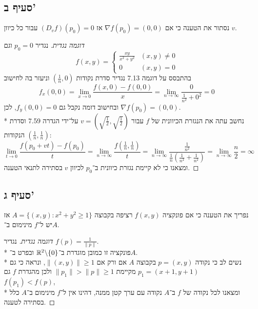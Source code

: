 \subsection{סעיף ב'}
נסתור את הטענה כי אם $\nabla f(p_0) = (0, 0)$ אז $(D_v f)(p_0) = 0$ עבור כל כיוון $v$.
\begin{proof}[דוגמה נגדית]
	נגדיר $p_0 = 0$ וגם 
	\[
		f(x, y) =
		\begin{cases}
			\frac{xy}{x^2 + y^2} & (x, y) \ne 0 \\
			0 & (x, y) = 0
		\end{cases}
	\]
	בהתבסס על דוגמה 7.13 נגדיר סדרת נקודות $(\frac{1}{n}, 0)$ וניעזר בה לחישוב
	\[
		f_x(0, 0)
		= \lim_{x \to 0} \frac{f(x, 0) - f(0, 0)}{x}
		= \lim_{n \to \infty} \frac{0}{\frac{1}{n^2} + 0^2}
		= 0
	\]
	ובחישוב דומה נקבל גם $f_y(0, 0) = 0$, לכן $\nabla f(p_0) = (0, 0)$. \\*
	נחשב עתה את הנגזרת הכיוונית של $f$ עבור $v = (\sqrt{\frac{1}{2}}, \sqrt{\frac{1}{2}})$ על־ידי הגדרה 7.59 וסדרת הנקודות $(\frac{1}{n}, \frac{1}{n})$:
	\[
		\lim_{t \to 0} \frac{f(p_0 + vt) - f(p_0)}{t}
		= \lim_{n \to \infty} \frac{f(\frac{1}{n}, \frac{1}{n})}{t}
		= \lim_{n \to \infty} \frac{\frac{1}{n^2}}{\frac{1}{n} (\frac{1}{n^2} + \frac{1}{n^2})}
		= \lim_{n \to \infty} \frac{n}{2}
		= \infty
	\]
	ומצאנו כי לא קיימת נגזרת כיוונית ב־$p_0$ לכיוון $v$ בסתירה לתנאי הטענה.
\end{proof}

\subsection{סעיף ג'}
נפריך את הטענה כי אם פונקציה $f(x, y)$ רציפה בקבוצה $A = \{ (x, y) : x^2 + y^2 \ge 1 \}$ אז יש ל־$f$ מינימום ב־$A$.
\begin{proof}[דוגמה נגדית]
	נגדיר $f(p) = \frac{1}{\lVert p \rVert}$. \\*
	פונקציה זו כמובן מוגדרת ב־$\mathbb{R}^2\backslash \{0\}$ ובפרט ב־$A$. \\*
	נשים לב כי נקודה $p = (x, y)$ בקבוצה $A$ אם ורק אם $\lVert (x, y) \rVert \ge 1$,
	ונראה כי גם $p_1 = (x + 1, y + 1)$ מקיימת $\lVert p_1 \rVert > \lVert p \rVert \ge 1$ ולכן מהגדרת $f$ גם $f(p_1) < f(p)$, \\*
	ומצאנו לכל נקודה של $f$ ב־$A$ נקודה עם ערך קטן ממנה, דהינו אין ל־$f$ מינימום ב־$A$ כלל בסתירה לטענה.
\end{proof}


